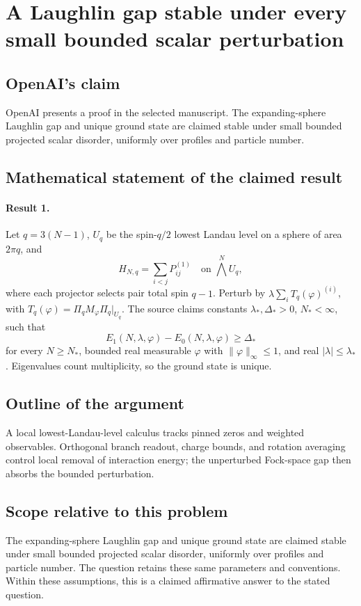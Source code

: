 \documentclass[11pt]{article}
\begin{document}
\section*{A Laughlin gap stable under every small bounded scalar perturbation}

\subsection{OpenAI's claim}
OpenAI presents a proof in the selected manuscript. The expanding-sphere Laughlin gap and unique ground state are claimed stable under small bounded projected scalar disorder, uniformly over profiles and particle number.

\subsection{Mathematical statement of the claimed result}
\paragraph{Result 1.} Let \(q=3(N-1)\), \(U_q\) be the spin-\(q/2\) lowest Landau level on a sphere of area \(2\pi q\), and
\[
 H_{N,q}=\sum_{i<j}P_{ij}^{(1)}\quad\text{on }\bigwedge^NU_q,
\]
where each projector selects pair total spin \(q-1\). Perturb by \(\lambda\sum_iT_q(\varphi)^{(i)}\), with \(T_q(\varphi)=\Pi_qM_\varphi\Pi_q|_{U_q}\). The source claims constants \(\lambda_*,\Delta_*>0\), \(N_*<\infty\), such that
\[
 E_1(N,\lambda,\varphi)-E_0(N,\lambda,\varphi)\ge\Delta_*
\]
for every \(N\ge N_*\), bounded real measurable \(\varphi\) with \(\|\varphi\|_\infty\le1\), and real \(|\lambda|\le\lambda_*\). Eigenvalues count multiplicity, so the ground state is unique.

\subsection{Outline of the argument}
A local lowest-Landau-level calculus tracks pinned zeros and weighted observables. Orthogonal branch readout, charge bounds, and rotation averaging control local removal of interaction energy; the unperturbed Fock-space gap then absorbs the bounded perturbation.

\subsection{Scope relative to this problem}
The expanding-sphere Laughlin gap and unique ground state are claimed stable under small bounded projected scalar disorder, uniformly over profiles and particle number. The question retains these same parameters and conventions. Within these assumptions, this is a claimed affirmative answer to the stated question.
\end{document}
